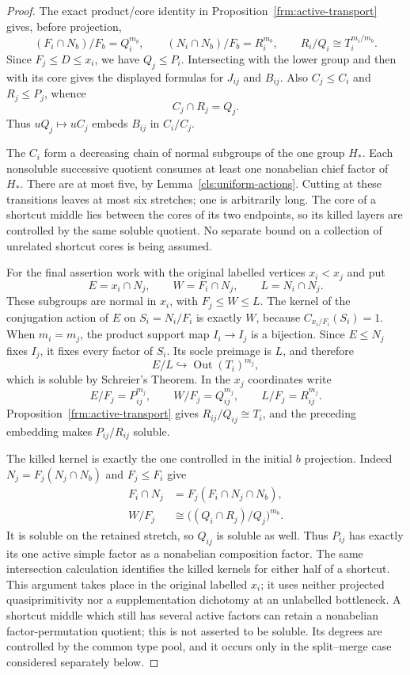 \begin{proof}
The exact product/core identity in
Proposition~\ref{frm:active-transport} gives, before projection,
\[
 (F_i\cap N_b)/F_b=Q_i^{m_b},\qquad
 (N_i\cap N_b)/F_b=R_i^{m_b},\qquad
 R_i/Q_i\cong T_i^{m_i/m_b}.
\]
Since $F_j\leq D\leq x_i$, we have $Q_j\leq P_i$.
Intersecting with the lower group and then with its core gives the
displayed formulas for $J_{ij}$ and $B_{ij}$.  Also $C_j\leq C_i$
and $R_j\leq P_j$, whence
\[
 C_j\cap R_j=Q_j.
\]
Thus $uQ_j\mapsto uC_j$ embeds $B_{ij}$ in $C_i/C_j$.

The $C_i$ form a decreasing chain of normal subgroups of the one
group $H_*$.  Each nonsoluble successive quotient consumes at least
one nonabelian chief factor of $H_*$.  There are at most five, by
Lemma~\ref{cls:uniform-actions}.  Cutting at these transitions
leaves at most six stretches; one is arbitrarily long.  The core
of a shortcut middle lies between the cores of its two endpoints,
so its killed layers are controlled by the same soluble quotient.
No separate bound on a collection of unrelated shortcut cores is
being assumed.

For the final assertion work with the original labelled vertices
$x_i<x_j$ and put
\[
 E=x_i\cap N_j,\qquad W=F_i\cap N_j,\qquad L=N_i\cap N_j.
\]
These subgroups are normal in $x_i$, with $F_j\leq W\leq L$.
The kernel of the conjugation action of $E$ on
$S_i=N_i/F_i$ is exactly $W$, because
$C_{x_i/F_i}(S_i)=1$.  When $m_i=m_j$, the product support map
$I_i\to I_j$ is a bijection.  Since $E\leq N_j$ fixes $I_j$,
it fixes every factor of $S_i$.  Its socle preimage is $L$, and
therefore
\[
 E/L\hookrightarrow\operatorname{Out}(T_i)^{m_j},
\]
which is soluble by Schreier's Theorem.  In the $x_j$ coordinates
write
\[
 E/F_j=P_{ij}^{m_j},\qquad W/F_j=Q_{ij}^{m_j},\qquad
 L/F_j=R_{ij}^{m_j}.
\]
Proposition~\ref{frm:active-transport} gives
$R_{ij}/Q_{ij}\cong T_i$, and the preceding embedding makes
$P_{ij}/R_{ij}$ soluble.

The killed kernel is exactly the one controlled in the initial
$b$ projection.  Indeed $N_j=F_j(N_j\cap N_b)$ and $F_j\leq F_i$
give
\begin{align}
 F_i\cap N_j&=F_j(F_i\cap N_j\cap N_b),\label{cls:killed-intersection}\\
 W/F_j&\cong
 \bigl((Q_i\cap R_j)/Q_j\bigr)^{m_b}.\label{cls:killed-kernel}
\end{align}
It is soluble on the retained stretch, so $Q_{ij}$ is soluble as
well.  Thus $P_{ij}$ has exactly its one active simple factor as a
nonabelian composition factor.  The same intersection calculation
identifies the killed kernels for either half of a shortcut.
This argument takes place in the original labelled $x_i$; it uses
neither projected quasiprimitivity nor a supplementation dichotomy
at an unlabelled bottleneck.  A shortcut middle which
still has several active factors can retain a nonabelian
factor-permutation quotient; this is not asserted to be soluble.
Its degrees are controlled by the common type pool, and it occurs
only in the split--merge case considered separately below.
\end{proof}

